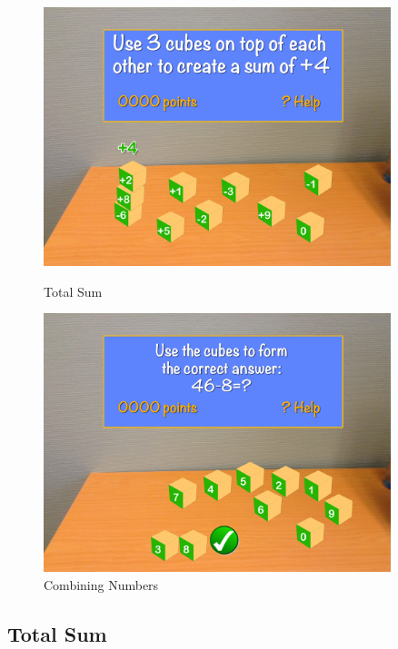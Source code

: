 \begin{figure}[h]
	\centering
	\begin{minipage}{.5\textwidth}
		\capstart
		\centering
		\includegraphics[width=0.9\textwidth]{images/Costas/game_mockup2(arithmetic).jpg}
		\vspace{-10pt}
		\caption{Total Sum}
		\label{fig:Costas_total_sum}
	\end{minipage}%
	\begin{minipage}{.5\textwidth}
		\capstart
		\centering
		\includegraphics[width=0.9\textwidth]{images/Costas/game_mockup2(arithmetic2).jpg}
		\vspace{-10pt}
		\caption{Combining Numbers}
		\label{fig:Costas_combining_numbers}
	\end{minipage}%
\end{figure}


\subsection{Total Sum}
\label{game:total_sum}

